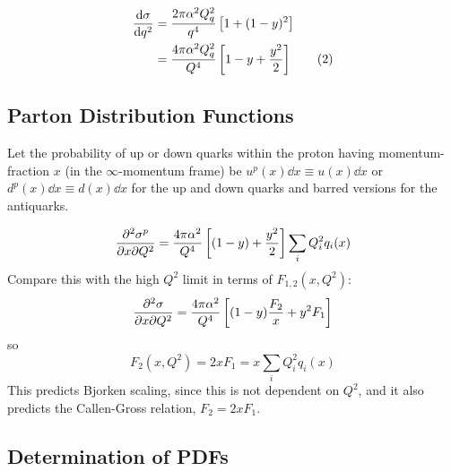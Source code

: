 \documentclass[a4paper,twoside,master.tex]{subfiles}
\begin{document}
\begin{align}
    \dv{\sigma}{q^2} &= \frac{2 \pi \alpha^2 Q_q^2}{q^4} \left[ 1 + (1 - y)^2 \right] \\
                     &= \frac{4 \pi \alpha^2 Q_q^2}{Q^4} \left[ 1 - y + \frac{y^2}{2} \right] \tag{2}
\end{align}

\subsection{Parton Distribution Functions}\label{sub:parton_distribution_functions}

Let the probability of up or down quarks within the proton having momentum-fraction $ x $ (in the $ \infty $-momentum frame) be $ u^p(x) \dd{x} \equiv u(x) \dd{x} $ or $ d^p(x) \dd{x} \equiv d(x) \dd{x} $ for the up and down quarks and barred versions for the antiquarks.

\begin{equation}
    \pdv[2]{\sigma^p}{x}{Q^2} = \frac{4 \pi \alpha^2}{Q^4} \left[ (1-y) + \frac{y^2}{2} \right] \sum_i Q_i^2 q_i(x)
\end{equation}
Compare this with the high $ Q^2 $ limit in terms of $ F_{1,2}(x, Q^2) $:
\begin{equation}
    \pdv{\sigma}{x}{Q^2} = \frac{4 \pi \alpha^2}{Q^4} \left[ (1-y) \frac{F_2}{x} + y^2 F_1 \right]
\end{equation}
so
\begin{equation}
    F_2(x, Q^2) = 2x F_1 = x \sum_i Q^2_i q_i(x)
\end{equation}
This predicts Bjorken scaling, since this is not dependent on $ Q^2 $, and it also predicts the Callen-Gross relation, $ F_2 = 2xF_1 $.

\subsection{Determination of PDFs}\label{sub:determination_of_pdfs}
\end{document}
